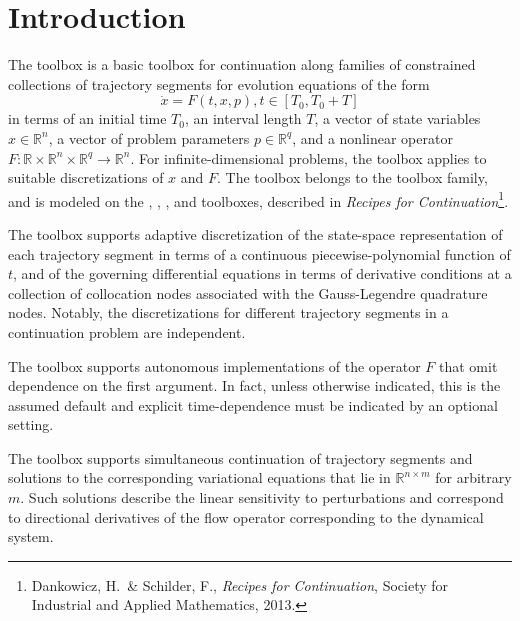  

\section{Introduction}
\label{chap: coll}

The  toolbox is a basic toolbox for continuation along families of constrained collections of trajectory segments for evolution equations of the form
\begin{equation}
\dot{x}=F(t,x,p), t\in[T_0,T_0+T]
\end{equation}
in terms of an initial time $T_0$, an interval length $T$, a vector of state variables $x\in\mathbb{R}^n$, a vector of problem parameters $p\in\mathbb{R}^q$, and a nonlinear operator $F:\mathbb{R}\times\mathbb{R}^n\times\mathbb{R}^q\rightarrow\mathbb{R}^n$. For infinite-dimensional problems, the toolbox applies to suitable discretizations of $x$ and $F$. The  toolbox belongs to the  toolbox family, and is modeled on the , , , and  toolboxes, described in \emph{Recipes for Continuation}\footnote{Dankowicz, H.~\& Schilder, F., \emph{Recipes for Continuation}, Society for Industrial and Applied Mathematics, 2013.}.

The  toolbox supports adaptive discretization of the state-space representation of each trajectory segment in terms of a continuous piecewise-polynomial function of $t$, and of the governing differential equations in terms of derivative conditions at a collection of collocation nodes associated with the Gauss-Legendre quadrature nodes. Notably, the discretizations for different trajectory segments in a continuation problem are independent.

The  toolbox supports autonomous implementations of the operator $F$ that omit dependence on the first argument. In fact, unless otherwise indicated, this is the assumed default and explicit time-dependence must be indicated by an optional setting.

The  toolbox supports simultaneous continuation of trajectory segments and solutions to the corresponding variational equations that lie in $\mathbb{R}^{n\times m}$ for arbitrary $m$. Such solutions describe the linear sensitivity to perturbations and correspond to directional derivatives of the flow operator corresponding to the dynamical system.

